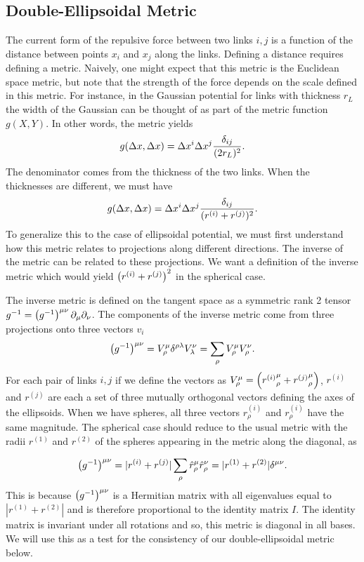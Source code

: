 \documentclass[endfloats,nofootinbib,preprint,floatfix,titlepage,superscriptaddress,linenumbers]{revtex4-1} %
\begin{document}
\subsection{Double-Ellipsoidal Metric }
The current form of the repulsive force between two links $i,j$ is a function of the distance between points $x_i$ and $x_j$ along the links. 
Defining a distance requires defining a metric. 
Naively, one might expect that this metric is the Euclidean space metric, but note that the strength of the force depends on the scale defined in this metric. 
For instance, in the Gaussian potential for links with thickness $r_L$ the width of the Gaussian can be thought of as part of the metric function $g(X,Y)$. 
In other words, the metric yields
\[g(\Delta x, \Delta x) = \Delta x^i \Delta x^j {\delta_{ij} \over (2 r_L)^2}.  \]
The denominator comes from the thickness of the two links. When the thicknesses are different, we must have
\[g(\Delta x, \Delta x) = \Delta x^i \Delta x^j {\delta_{ij} \over ( r^{(i)} +r^{(j)})^2}.  \]
To generalize this to the case of ellipsoidal potential, we must first understand how this metric relates to projections along different directions. 
The inverse of the metric can be related to these projections. 
We want a definition of the inverse metric which would yield $\left(r^{(i)} +r^{(j)}\right)^2$ in the spherical case. 

The inverse metric is defined on the tangent space as a symmetric rank 2 tensor $ g^{-1} = \left(g^{-1}\right)^{\mu\nu}\partial_\mu \partial_\nu $. 
The components of the inverse metric  come from three projections onto three vectors $v_i$
\begin{equation}
    \left(g^{-1}\right)^{\mu\nu} = V^\mu_\rho \delta^{\rho \lambda} V^\nu_\lambda =  \sum_{\rho} V_\rho^\mu V_\rho^\nu. \label{eq:ginv}
\end{equation}
For each pair of links $i,j$ if we define the vectors as $V_\rho^\mu =%
\pr{{r^{(i)}}_{\rho}^\mu+{r^{(j)}}_{\rho}^\mu} $, 
$r^{(i)}$ and $r^{(j)}$ are each a set of three mutually orthogonal vectors defining the axes of the ellipsoids. 
When we have spheres, all three vectors $r^{(i)}_\rho$ and $r^{(i)}_\rho$ have the same magnitude. 
The spherical case should reduce to the usual metric with the radii $r^{(1)}$ and $r^{(2)}$ of the spheres appearing in the metric along the diagonal, as 

$$ \left(g^{-1}\right)^{\mu\nu} = |r^{(i)}+r^{(j)}|\sum_{\rho} \hat{r}_\rho^\mu \hat{r}_\rho^\nu = |r^{(1)}+r^{(2)}| \delta^{\mu\nu }.$$
This is because $ \left(g^{-1}\right)^{\mu\nu} $ is a Hermitian matrix with all eigenvalues equal to $|r^{(1)}+r^{(2)}|$ and is therefore proportional to the identity matrix $I$. The identity matrix is invariant under all rotations and so, this metric is diagonal in all bases.
We will use this as a test for the consistency of our double-ellipsoidal metric below. 
 
\end{document}

